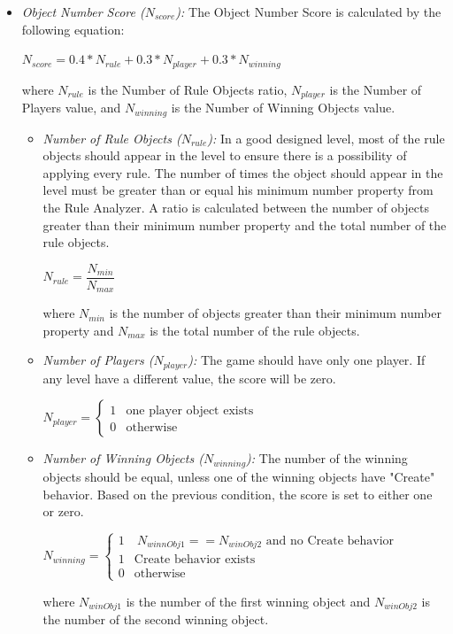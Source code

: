 \documentclass[letterpaper]{article}
\begin{document}
\begin{itemize}
	\item \emph{Object Number Score ($N_{score}$):} The Object Number Score is calculated by the following equation:
	\begin{center}$N_{score} = 0.4 * N_{rule} + 0.3 * N_{player} + 0.3 * N_{winning}$\end{center}
	where $N_{rule}$ is the Number of Rule Objects ratio, $N_{player}$ is the Number of Players value, and $N_{winning}$ is the Number of Winning Objects value.
	\begin{itemize}
		\item \emph{Number of Rule Objects ($N_{rule}$):} In a good designed level, most of the rule objects should appear in the level to ensure there is a possibility of applying every rule. The number of times the object should appear in the level must be greater than or equal his minimum number property from the Rule Analyzer. A ratio is calculated between the number of objects greater than their minimum number property and the total number of the rule objects.
		\begin{center}$N_{rule} = \dfrac{N_{min}}{N_{max}}$\end{center}
		where $N_{min}$ is the number of objects greater than their minimum number property and $N_{max}$ is the total number of the rule objects.
		\item \emph{Number of Players ($N_{player}$):} The game should have only one player. If any level have a different value, the score will be zero.
		\begin{center}
		$N_{player}= \begin{cases}
		               1 & \text{one player object exists}\\
		               0 & \text{otherwise}
		           \end{cases}$
		\end{center}
		\item \emph{Number of Winning Objects ($N_{winning}$):} The number of the winning objects should be equal, unless one of the winning objects have "Create" behavior. Based on the previous condition, the score is set to either one or zero.
		\begin{center}
			$N_{winning}= \begin{cases}
			               1 & \ N_{winnObj1} == N_{winObj2} \text{ and no Create behavior}\\
			               1 & \text{Create behavior exists}\\
			               0 & \text{otherwise}
			           \end{cases}$
		\end{center}
		where $N_{winObj1}$ is the number of the first winning object and $N_{winObj2}$ is the number of the second winning object.
	\end{itemize}
	

\end{itemize}
\end{document}
